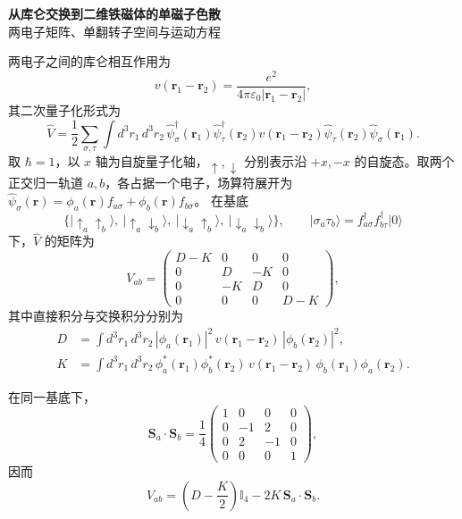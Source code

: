 \documentclass[UTF8,11pt,a4paper,fontset=fandol]{ctexart}
\newcommand{\ket}[1]{\lvert #1\rangle}
\newcommand{\id}{\mathbb I}
\begin{document}
\begin{center}
{\LARGE\bfseries\color{ink}从库仑交换到二维铁磁体的单磁子色散}\\[0.65em]
{\small 两电子矩阵、单翻转子空间与运动方程}
\end{center}
\vspace{0.3em}

两电子之间的库仑相互作用为
\begin{equation}
v(\mathbf r_1-\mathbf r_2)=
\frac{e^2}{4\pi\varepsilon_0|\mathbf r_1-\mathbf r_2|},
\end{equation}
其二次量子化形式为
\begin{equation}
\hat V=\frac12\sum_{\sigma,\tau}
\int d^3r_1\,d^3r_2\,
\hat\psi^\dagger_\sigma(\mathbf r_1)
\hat\psi^\dagger_\tau(\mathbf r_2)
v(\mathbf r_1-\mathbf r_2)
\hat\psi_\tau(\mathbf r_2)\hat\psi_\sigma(\mathbf r_1).
\end{equation}
取 $\hbar=1$，以 $x$ 轴为自旋量子化轴，$\uparrow,\downarrow$ 分别表示沿 $+x,-x$ 的自旋态。取两个正交归一轨道 $a,b$，各占据一个电子，场算符展开为
$\hat\psi_\sigma(\mathbf r)=\phi_a(\mathbf r)f_{a\sigma}+\phi_b(\mathbf r)f_{b\sigma}$。
在基底
\begin{equation}
\bigl\{
\ket{\uparrow_a\uparrow_b},\
\ket{\uparrow_a\downarrow_b},\
\ket{\downarrow_a\uparrow_b},\
\ket{\downarrow_a\downarrow_b}
\bigr\},\qquad
\ket{\sigma_a\tau_b}=f^\dagger_{a\sigma}f^\dagger_{b\tau}\ket{0}
\label{eq:pairbasis}
\end{equation}
下，$\hat V$ 的矩阵为
\begin{equation}
V_{ab}=
\begin{pmatrix}
D-K&0&0&0\\
0&D&-K&0\\
0&-K&D&0\\
0&0&0&D-K
\end{pmatrix},
\label{eq:coulombmatrix}
\end{equation}
其中直接积分与交换积分分别为
\begin{align}
D&=\int d^3r_1\,d^3r_2\,
|\phi_a(\mathbf r_1)|^2\,v(\mathbf r_1-\mathbf r_2)\,
|\phi_b(\mathbf r_2)|^2, \label{eq:direct}\\
K&=\int d^3r_1\,d^3r_2\,
\phi_a^*(\mathbf r_1)\phi_b^*(\mathbf r_2)\,
v(\mathbf r_1-\mathbf r_2)\,
\phi_b(\mathbf r_1)\phi_a(\mathbf r_2). \label{eq:exchange}
\end{align}

在同一基底下，
\begin{equation}
\mathbf S_a\cdot\mathbf S_b
=\frac14
\begin{pmatrix}
1&0&0&0\\
0&-1&2&0\\
0&2&-1&0\\
0&0&0&1
\end{pmatrix},
\label{eq:dotmatrix}
\end{equation}
因而
\begin{equation}
\boxed{
V_{ab}=\left(D-\frac K2\right)\id_4
-2K\,\mathbf S_a\cdot\mathbf S_b.
}
\label{eq:pairspin}
\end{equation}
\end{document}
